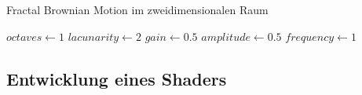 \begin{algorithm}
  \caption{Fractal Brownian Motion im zweidimensionalen Raum}
  \label{alg:fbm}
  \SetAlgoLined

  $octaves\leftarrow 1$\;
  $lacunarity\leftarrow 2$\;
  $gain\leftarrow 0.5$\;
  \BlankLine
  $amplitude\leftarrow 0.5$\;
  $frequency\leftarrow 1$\;
  \BlankLine
\end{algorithm}

\subsection{Entwicklung eines Shaders}
